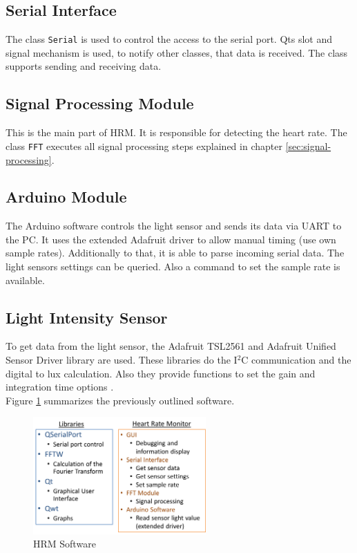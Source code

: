 \documentclass[notitlepage]{scrreprt}
\begin{document}
\subsection{Serial Interface}
The class \lstinline{Serial} is used to control the access to the serial port. Qts slot and signal mechanism is used, to notify other classes, that data is received. The class supports sending and receiving data. 

\subsection{Signal Processing Module}
This is the main part of HRM. It is responsible for detecting the heart rate. The class \lstinline{FFT} executes all signal processing steps explained in chapter \ref{sec:signal-processing}.

\subsection{Arduino Module}
The Arduino software controls the light sensor and sends its data via UART to the PC. It uses the extended Adafruit driver to allow manual timing (use own sample rates). Additionally to that, it is able to parse incoming serial data. The light sensors settings can be queried. Also a command to set the sample rate is available.

\newpage

\subsection{Light Intensity Sensor}
To get data from the light sensor, the Adafruit TSL2561 and Adafruit Unified Sensor Driver library are used. These libraries do the I$^{2}$C communication and the digital to lux calculation. Also they provide functions to set the gain and integration time options \cite{bib:tsl-library} \cite{bib:sensor-library}.\\

Figure \ref{fig:software} summarizes the previously outlined software.

\begin{figure}[H]
	\centering
	\includegraphics[width=250px]{images/software.png}
	\caption{HRM Software}
	\label{fig:software}
\end{figure}
\end{document}
